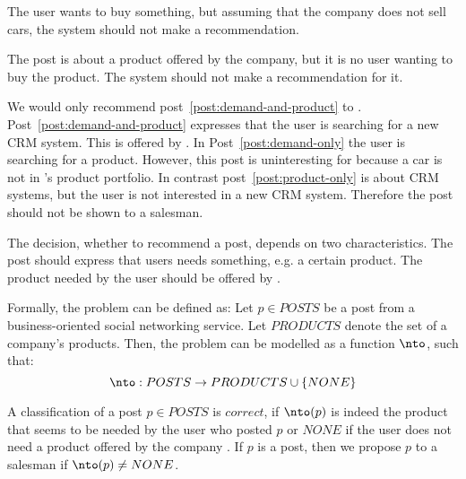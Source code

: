 \begin{post}
	\centering
	\caption{The user wants to buy something, but assuming that the company does not sell cars, the system should not make a recommendation.}
	\label{post:demand-only}
\end{post}

\begin{post}
	\centering
	\caption{The post is about a product offered by the company, but it is no user wanting to buy the product. The system should not make a recommendation for it.}
	\label{post:product-only}
\end{post}

We would only recommend post~\ref{post:demand-and-product} to \acme.
Post~\ref{post:demand-and-product} expresses that the user is searching for a new CRM system.
This is offered by \acme.
In Post~\ref{post:demand-only} the user is searching for a product. 
However, this post is uninteresting for \acme because a car is not in \acme's product portfolio. 
In contrast post~\ref{post:product-only} is about CRM systems, but the user is not interested in a new CRM system.
Therefore the post should not be shown to a salesman.

The decision, whether to recommend a post, depends on two characteristics.
The post should express that users needs something, e.g. a certain product.
The product needed by the user should be offered by \acme.


Formally, the problem can be defined as: 
Let $p \in POSTS$ be a post from a business-oriented social networking service.
Let $PRODUCTS$ denote the set of a company's products.
Then, the problem can be modelled as a function $\nto$, such that:
\begin{displaymath}
	\nto: POSTS \to PRODUCTS \cup \{NONE\}
\end{displaymath}


A classification of a post $p \in POSTS$ is $correct$, if $\nto(p)$ is indeed the product that seems to be needed by the user who posted $p$ or $NONE$ if the user does not need a product offered by the company \acme.
If $p$ is a post, then we propose $p$ to a salesman if $\nto(p) \neq NONE$.

